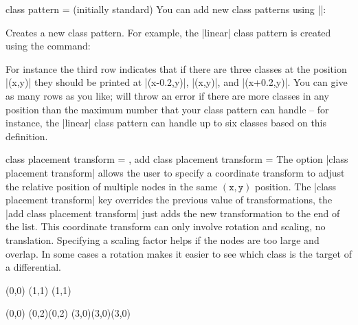 \begin{sseqdata}[|| name = ex1, cohomological Serre grading]
\begin{key}{class pattern =  (initially standard)}
You can add new class patterns using |\sseqnewclasspattern|:
\begin{command}{\sseqnewclasspattern{}}
Creates a new class pattern. For example, the |linear| class pattern is created using the command:
\begin{codeexample}
\end{codeexample}
For instance the third row indicates that if there are three classes at the position |(x,y)| they should be printed at |(x-0.2,y)|, |(x,y)|, and |(x+0.2,y)|. You can give as many rows as you like; \sseqpages\space will throw an error if there are more classes in any position than the maximum number that your class pattern can handle -- for instance, the |linear| class pattern can handle up to six classes based on this definition.
\end{command}
\end{key}


\begin{key}{class placement transform = , add class placement transform =  }
The option |class placement transform| allows the user to specify a \tikzpkg\space coordinate transform to adjust the relative position of multiple nodes in the same $\mathtt{(x,y)}$ position. The |class placement transform| key overrides the previous value of transformations, the |add class placement transform| just adds the new transformation to the end of the list. This coordinate transform can only involve rotation and scaling, no translation. Specifying a scaling factor helps if the nodes are too large and overlap. In some cases a rotation makes it easier to see which class is the target of a differential.
\begin{codeexample}[width = 5cm]
\begin{sseqpage}[ class placement transform = { xscale = 3 },
                  class pattern = linear,
                  classes = { draw = none },
                  xscale = 2, x axis extend end = 0.7cm ]
\class["\mathbb{Z}"](0,0)
\class["\mathbb{Z}/2"](1,1)
\class["\mathbb{Z}/3"](1,1)
\end{sseqpage}
\end{codeexample}
\begin{codeexample}[width = 5cm]
\begin{sseqpage}[ class placement transform = { rotate = 40 },
                  cohomological Serre grading, scale = 0.65,
                  classes = fill, differentials = blue ]
\class(0,0)
\class(0,2)\class(0,2)
\class[red](3,0)\class[green](3,0)\class[blue](3,0)


\end{sseqpage}
\end{codeexample}
\end{key}
\end{sseqdata}
